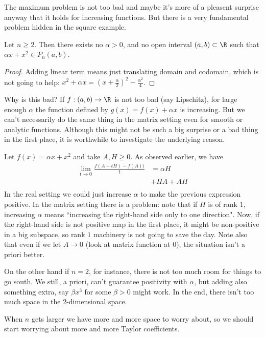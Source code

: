 The maximum problem is not too bad and maybe it's more of a pleasent surprise anyway that it holds for increasing functions. But there is a very fundamental problem hidden in the square example.

\begin{prop}
	Let $n \geq 2$. Then there exists no $\alpha > 0$, and no open interval $(a, b) \subset \R$ such that $\alpha x + x^{2} \in P_{n}(a, b)$.
\end{prop}
\begin{proof}
	Adding linear term means just translating domain and codomain, which is not going to help: $x^2 + \alpha x = (x + \frac{\alpha}{2})^2 - \frac{\alpha^2}{4}$.
\end{proof}

Why is this bad? If $f : (a, b) \to \R$ is not too bad (say Lipschitz), for large enough $\alpha$ the function defined by $g(x) = f(x) + \alpha x$ is increasing. But we can't necessarily do the same thing in the matrix setting even for smooth or analytic functions. Although this might not be such a big surprise or a bad thing in the first place, it is worthwhile to investigate the underlying reason.

Let $f(x) = \alpha x + x^2$ and take $A, H \geq 0$. As observed earlier, we have
\begin{align*}
	\lim_{t \to 0} \frac{f(A + t H) - f(A))}{t} &= \alpha H \\
	&+ H A + A H\\
\end{align*}
In the real setting we could just increase $\alpha$ to make the previous expression positive. In the matrix setting there is a problem: note that if $H$ is of rank $1$, increasing $\alpha$ means ``increasing the right-hand side only to one direction". Now, if the right-hand side is not positive map in the first place, it might be non-positive in a big subspace, so rank $1$ machinery is not going to save the day. Note also that even if we let $A \to 0$ (look at matrix function at $0$), the situation isn't a priori better.

On the other hand if $n = 2$, for instance, there is not too much room for things to go south. We still, a priori, can't guarantee positivity with $\alpha$, but adding also something extra, say $\beta x^3$ for some $\beta > 0$ might work. In the end, there isn't too much space in the $2$-dimensional space.

When $n$ gets larger we have more and more space to worry about, so we should start worrying about more and more Taylor coefficients.

